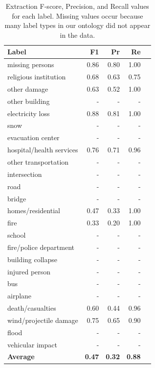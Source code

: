\documentclass{article}
\begin{document}
\begin{table}[t]
\centering
\small
\begin{tabular}{|l|r|r|r| p{8cm} |}
\hline
{\bf Label}  & {\bf F1} & {\bf Pr} & {\bf Re} \\
\hline
missing persons &  0.86  & 0.80       &  1.00 \\
religious institution          &  0.68  &    0.63    &  0.75\\
other damage        &  0.63  & 0.52   &  1.00\\
other building        &  - & -  &  -\\
electricity loss     & 0.88 & 0.81   &  1.00\\
snow        & - & - & - \\
evacuation center    &  - &  -   &  - \\
hospital/health services & 0.76 & 0.71 & 0.96 \\
other transportation & - & - & - \\
intersection & - & - & - \\
road        & - & - & - \\
bridge       & - & - &  -\\
homes/residential    & 0.47 & 0.33 &  1.00\\
fire & 0.33 & 0.20 & 1.00 \\
school & - & - & - \\
fire/police department & - & - & - \\
building collapse        & - & - & - \\
injured person & - & - & - \\
bus & -   &  -    &  -\\
airplane & -  &  -  &  -\\
death/casualties & 0.60  &  0.44  &  0.96\\
wind/projectile damage & 0.75  &  0.65   &  0.90\\
flood & -   &  -  &  -\\
vehicular impact & -   &  -    &  -\\
\hline
{\bf Average}  & {\bf 0.47} & {\bf 0.32}  & {\bf 0.88}  \\
\hline
\end{tabular}
\caption{Extraction F-score, Precision, and Recall values for each
  label. Missing values occur because many label types in our ontology did not
  appear in the data. \label{tab.by_label} }
\end{table}
\end{document}

